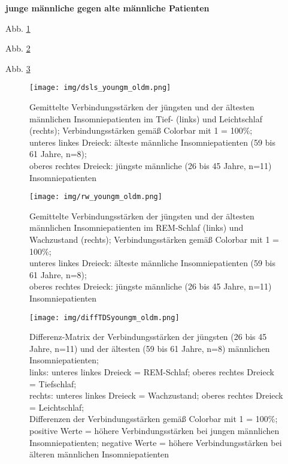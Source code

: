 \textbf{junge männliche gegen alte männliche Patienten}

Abb. \ref{fig:dsls_youngm_oldm}

Abb. \ref{fig:rw_youngm_oldm}

Abb. \ref{fig:diffTDSyoungm_oldm}

\begin{figure}[H]
	\centering
	\texttt{[image: img/dsls\_youngm\_oldm.png]}
	\caption[Verbindungsstärken der jüngsten und der ältesten männlichen Insomniepatienten im Tief- und Leichtschlaf]{Gemittelte Verbindungsstärken der jüngsten und der ältesten männlichen Insomniepatienten im Tief- (links) und Leichtschlaf (rechts); Verbindungsstärken gemäß Colorbar mit 1 = 100\%;\\unteres linkes Dreieck: älteste männliche Insomniepatienten (59 bis 61 Jahre, n=8);\\oberes rechtes Dreieck: jüngste männliche (26 bis 45 Jahre, n=11) Insomniepatienten}
	\label{fig:dsls_youngm_oldm}
\end{figure}

\begin{figure}[H]
	\centering
	\texttt{[image: img/rw\_youngm\_oldm.png]}
	\caption[Verbindungsstärken der jüngsten und der ältesten männlichen Insomniepatienten im REM-Schlaf und Wachzustand]{Gemittelte Verbindungsstärken der jüngsten und der ältesten männlichen Insomniepatienten im REM-Schlaf (links) und Wachzustand (rechts); Verbindungsstärken gemäß Colorbar mit 1 = 100\%;\\unteres linkes Dreieck: älteste männliche Insomniepatienten (59 bis 61 Jahre, n=8);\\oberes rechtes Dreieck: jüngste männliche (26 bis 45 Jahre, n=11) Insomniepatienten}
	\label{fig:rw_youngm_oldm}
\end{figure}

\begin{figure}[H]
	\centering
	\texttt{[image: img/diffTDSyoungm\_oldm.png]}
	\caption[Differenz-Matrix der Verbindungsstärken der jüngsten und ältesten männlichen Insomniepatienten]{Differenz-Matrix der Verbindungsstärken der jüngsten (26 bis 45 Jahre, n=11) und der ältesten (59 bis 61 Jahre, n=8) männlichen Insomniepatienten;\\links: unteres linkes Dreieck = REM-Schlaf; oberes rechtes Dreieck = Tiefschlaf;\\rechts: unteres linkes Dreieck = Wachzustand; oberes rechtes Dreieck = Leichtschlaf;\\Differenzen der Verbindungsstärken gemäß Colorbar mit 1 = 100\%;\\positive Werte = höhere Verbindungsstärken bei jungen männlichen Insomniepatienten; negative Werte = höhere Verbindungsstärken bei älteren männlichen Insomniepatienten}
	\label{fig:diffTDSyoungm_oldm}
\end{figure}




